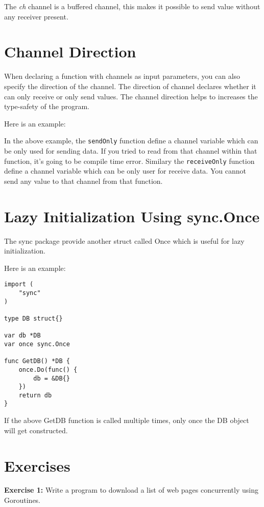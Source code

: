 The \textit{ch} channel is a buffered channel, this makes it possible
to send value without any receiver present.

\section{Channel Direction}

When declaring a function with channels as input parameters, you can
also specify the direction of the channel.  The direction of channel
declares whether it can only receive or only send values.  The channel
direction helps to increases the type-safety of the program.

Here is an example:



In the above example, the \texttt{sendOnly} function define a channel
variable which can be only used for sending data.  If you tried to
read from that channel within that function, it's going to be compile
time error.  Similary the \texttt{receiveOnly} function define a
channel variable which can be only user for receive data.  You cannot
send any value to that channel from that function.

\section{Lazy Initialization Using sync.Once}

The sync package provide another struct called Once which
is useful for lazy initialization.

Here is an example:

\begin{lstlisting}[numbers=none]
import (
    "sync"
)

type DB struct{}

var db *DB
var once sync.Once

func GetDB() *DB {
    once.Do(func() {
        db = &DB{}
    })
    return db
}
\end{lstlisting}

If the above GetDB function is called multiple times, only once the DB
object will get constructed.

\section{Exercises}

\textbf{Exercise 1:} Write a program to download a list of web pages concurrently using
Goroutines.

